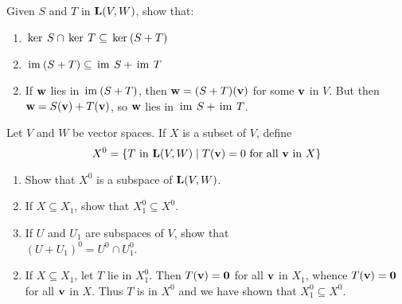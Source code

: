 \begin{multicols}{1}
\begin{ex}
\begin{sol}
\begin{enumerate}[label={\alph*.}]
\end{enumerate}
\end{sol}
\end{ex}

\begin{ex}
Given $S$ and $T$ in $\textbf{L}(V, W)$, show that:


\begin{enumerate}[label={\alph*.}]
\item $\thinspace\operatorname{ker \medspace}S \cap \thinspace\operatorname{ker \medspace}T \subseteq \thinspace\operatorname{ker\medspace}(S + T)$

\item $\thinspace\operatorname{im\medspace}(S + T) \subseteq \thinspace\operatorname{im \medspace}S + \thinspace\operatorname{im \medspace}T$

\end{enumerate}
\begin{sol}
\begin{enumerate}[label={\alph*.}]
\setcounter{enumi}{1}
\item  If $\textbf{w}$ lies in $\thinspace\operatorname{im\medspace}(S + T)$, then $\textbf{w} = (S + T)(\textbf{v})$ for some $\textbf{v}$ in $V$. But then $\textbf{w} = S(\textbf{v}) + T(\textbf{v})$, so $\textbf{w}$ lies in $\thinspace\operatorname{im \medspace}S + \thinspace\operatorname{im\medspace}T$.

\end{enumerate}
\end{sol}
\end{ex}

\begin{ex}
Let $V$ and $W$ be vector spaces. If $X$ is a subset of $V$, define 
\begin{equation*}
X^{0} = \{T \mbox{ in } \textbf{L}(V, W) \mid T(\textbf{v}) = 0 \mbox{ for all } \textbf{v} \mbox{ in } X\}
\end{equation*}


\begin{enumerate}[label={\alph*.}]
\item Show that $X^{0}$ is a subspace of $\textbf{L}(V, W)$.

\item If $X \subseteq X_{1}$, show that $X_1^0 \subseteq X^0$.

\item If $U$ and $U_{1}$ are subspaces of $V$, show that \\$(U + U_1)^0 = U^0 \cap U_1^0$.

\end{enumerate}
\begin{sol}
\begin{enumerate}[label={\alph*.}]
\setcounter{enumi}{1}
\item If $X \subseteq X_{1}$, let $T$ lie in $X_1^0$. Then $T(\textbf{v}) = \textbf{0}$ for all $\textbf{v}$ in $X_{1}$, whence $T(\textbf{v}) = \textbf{0}$ for all $\textbf{v}$ in $X$. Thus $T$ is in $X^{0}$ and we have shown that $X_1^0 \subseteq X^{0}$.


\end{enumerate}
\end{sol}
\end{ex}
\end{multicols}

